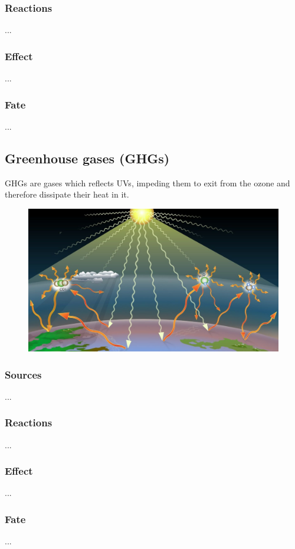 \documentclass{article}
\newcommand{\cfig}[1]{%
  \begin{figure}[ht!]%
    \centering%
    #1%
  \end{figure}%
}
\begin{document}
\subsubsection{Reactions}
...

\subsubsection{Effect}
...

\subsubsection{Fate}
... 

\subsection{Greenhouse gases (GHGs)}
GHGs are gases which reflects UVs, impeding them to exit from the ozone
and therefore dissipate their heat in it.

\cfig{\includegraphics*[width=.8\textwidth]{media/Treibhauseffekt-Graphik.jpg}}

\subsubsection{Sources}
...

\subsubsection{Reactions}
...

\subsubsection{Effect}
...

\subsubsection{Fate}
... 
\end{document}
